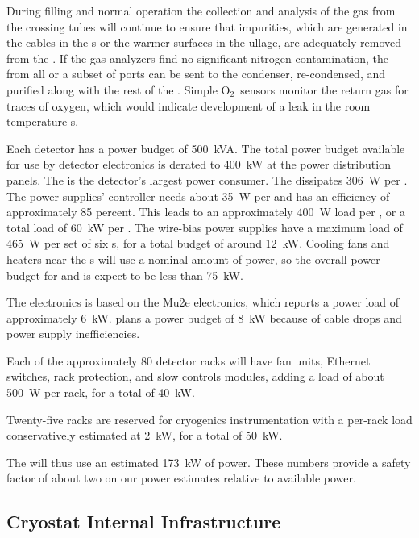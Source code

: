 During filling and normal operation the collection and analysis of the gas from the crossing tubes will continue to ensure that impurities, which are generated in the cables in the \fdth{}s or the warmer surfaces in the ullage,  are adequately removed from the . If the gas analyzers find no significant nitrogen contamination, the  from all or a subset of ports can be sent to the condenser, re-condensed, and purified along with the rest of the . Simple O$_2$\ sensors monitor the return gas for traces of oxygen, which would indicate development of a leak in the room temperature \fdth{}s.

Each detector has a power budget of \SI{500}{kVA}. The total power budget available for use by detector electronics is derated to \SI{400}{kW} at the power distribution panels.  The  is the detector's largest power consumer.  
The  dissipates \SI{306}{W} per .  
The  power supplies' controller needs about \SI{35}{W} per  and has an efficiency of approximately 85 percent. This leads to an approximately  \SI{400}{W} load per , or a total load of  \SI{60}{kW} per .  The  wire-bias power supplies have a maximum load of  \SI{465}{W} per set of six s, for a total budget of around  \SI{12}{kW}.   Cooling fans and heaters near the \fdth{}s will use a nominal amount of power, so the overall power budget for  and  
is expect to be less than \SI{75}{kW}.


The  electronics is based on the Mu2e electronics, which reports a power load of approximately  \SI{6}{kW}.   plans a power budget of  \SI{8}{kW} because of cable drops and  power supply inefficiencies.  

Each of the approximately 80 detector racks will have fan units, Ethernet switches, rack protection, and slow controls modules, adding a load of about \SI{500}{W} per rack, for a total of \SI{40}{kW}.

Twenty-five racks are reserved for cryogenics instrumentation with a per-rack load conservatively estimated at \SI{2}{kW}, for a total of \SI{50}{kW}. 

The  will thus use  an estimated \SI{173}{kW} of power.   These numbers provide a safety factor of about two on our power estimates relative to available power.


\subsection{Cryostat Internal Infrastructure}
\label{sec:fdsp-tc-infr-cryo-int}

